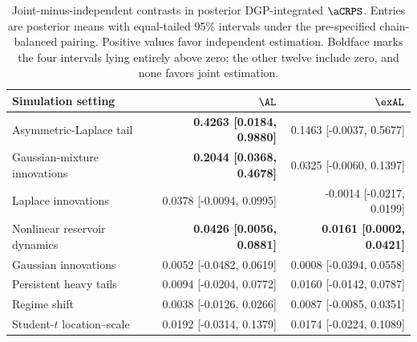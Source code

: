 \begin{table}[!htbp]
\centering
\small
\begin{tabular}{@{}>{\raggedright\arraybackslash}p{}rr@{}}
\toprule
Simulation setting & \(\AL\) & \(\exAL\) \\
\midrule
Asymmetric-Laplace tail & \textbf{0.4263 [0.0184, 0.9880]} & 0.1463 [-0.0037, 0.5677] \\
Gaussian-mixture innovations & \textbf{0.2044 [0.0368, 0.4678]} & 0.0325 [-0.0060, 0.1397] \\
Laplace innovations & 0.0378 [-0.0094, 0.0995] & -0.0014 [-0.0217, 0.0199] \\
Nonlinear reservoir dynamics & \textbf{0.0426 [0.0056, 0.0881]} & \textbf{0.0161 [0.0002, 0.0421]} \\
Gaussian innovations & 0.0052 [-0.0482, 0.0619] & 0.0008 [-0.0394, 0.0558] \\
Persistent heavy tails & 0.0094 [-0.0204, 0.0772] & 0.0160 [-0.0142, 0.0787] \\
Regime shift & 0.0038 [-0.0126, 0.0266] & 0.0087 [-0.0085, 0.0351] \\
Student-\(t\) location--scale & 0.0192 [-0.0314, 0.1379] & 0.0174 [-0.0224, 0.1089] \\
\bottomrule
\end{tabular}
\caption{Joint-minus-independent contrasts in posterior DGP-integrated \(\aCRPS\). Entries are posterior means with equal-tailed 95\% intervals under the pre-specified chain-balanced pairing. Positive values favor independent estimation. Boldface marks the four intervals lying entirely above zero; the other twelve include zero, and none favors joint estimation.}
\label{tab:supp-joint-qdesn-corrected-v4-contrasts}
\end{table}
